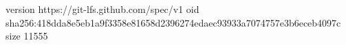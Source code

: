 version https://git-lfs.github.com/spec/v1
oid sha256:418dda8e5eb1a9f3358e81658d2396274edaec93933a7074757e3b6eceb4097c
size 11555
